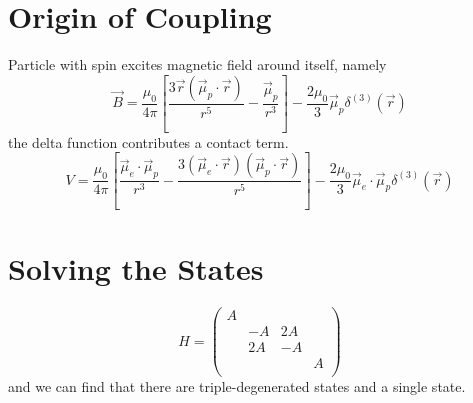 \section{Origin of Coupling}
Particle with spin excites magnetic field around itself, namely
\begin{equation}
  \vec{B} = \frac{\mu_0}{4\pi}\left[ \frac{3\vec{r} \left( \vec{\mu}_{p} \cdot \vec{r} \right) }{r^{5}} - \frac{\vec{\mu}_{p}}{r^{3}} \right] - \frac{2\mu_0}{3} \vec{\mu}_{p} \delta^{(3)} \left( \vec{r} \right) 
\end{equation}
the delta function contributes a contact term.
\begin{equation}
  V = \frac{\mu_0}{4\pi} \left[ \frac{\vec{\mu}_{e}\cdot \vec{\mu}_{p}}{r^{3}} - \frac{3\left( \vec{\mu}_{e} \cdot \vec{r} \right) \left( \vec{\mu}_{p} \cdot \vec{r} \right) }{r^{5}} \right] - \frac{2\mu_0}{3} \vec{\mu}_{e} \cdot \vec{\mu}_{p} \delta^{(3)} \left( \vec{r} \right) 
\end{equation}

\section{Solving the States}
\begin{equation}
  H = \begin{pmatrix}
   A &  &  & \\
    & -A & 2A & \\
    & 2A & -A & \\
    &  &  & A\\
  \end{pmatrix}
\end{equation}
and we can find that there are triple-degenerated states and a single state.